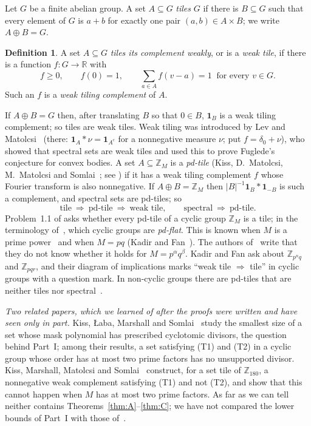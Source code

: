 \documentclass[11pt,a4paper]{amsart}
\theoremstyle{definition}
\newtheorem{definition}[theorem]{Definition}
\theoremstyle{remark}
\newcommand{\Z}{\mathbb{Z}}
\newcommand{\R}{\mathbb{R}}
\newcommand{\one}{\mathbf{1}}
\begin{document}
Let $G$ be a finite abelian group. A set $A\subseteq G$ \emph{tiles} $G$ if there is $B\subseteq G$ such that
every element of $G$ is $a+b$ for exactly one pair $(a,b)\in A\times B$; we write $A\oplus B=G$.

\begin{definition}
A set $A\subseteq G$ \emph{tiles its complement weakly}, or is a \emph{weak tile}, if there is a function
$f\colon G\to\R$ with
\[
 f\ge 0,\qquad f(0)=1,\qquad \sum_{a\in A} f(v-a)=1\ \text{ for every } v\in G .
\]
Such an $f$ is a \emph{weak tiling complement} of $A$.
\end{definition}

If $A\oplus B=G$ then, after translating $B$ so that $0\in B$, $\one_B$ is a weak tiling complement; so tiles are
weak tiles. Weak tiling was introduced by Lev and Matolcsi~\cite{LM} (there: $\one_A*\nu=\one_{A^c}$ for a
nonnegative measure $\nu$; put $f=\delta_0+\nu$), who showed that spectral sets are weak tiles and used this to
prove Fuglede's conjecture for convex bodies. A set $A\subseteq\Z_M$ is a \emph{pd-tile} (Kiss, D.~Matolcsi,
M.~Matolcsi and Somlai~\cite{KMMS}; see \cite{KLMS}) if it has a weak tiling complement $f$ whose Fourier
transform is also nonnegative. If $A\oplus B=\Z_M$ then $|B|^{-1}\one_B*\one_{-B}$ is such a complement, and
spectral sets are pd-tiles; so
\[
 \text{tile}\ \Longrightarrow\ \text{pd-tile}\ \Longrightarrow\ \text{weak tile},\qquad
 \text{spectral}\ \Longrightarrow\ \text{pd-tile}.
\]
Problem~1.1 of \cite{KLMS} asks whether every pd-tile of a cyclic group $\Z_M$ is a tile; in the terminology
of~\cite{KMMS}, which cyclic groups are \emph{pd-flat}. This is known when $M$ is a prime power~\cite{KLMS} and
when $M=pq$ (Kadir and Fan~\cite{KF}). The authors of~\cite{KLMS} write that they do not know whether it holds
for $M=p^\alpha q^\beta$. Kadir and Fan ask about $\Z_{p^nq}$ and $\Z_{pqr}$, and their diagram of implications
marks ``weak tile $\Rightarrow$ tile'' in cyclic groups with a question mark. In non-cyclic groups there are
pd-tiles that are neither tiles nor spectral~\cite{KLMS2}.

\emph{Two related papers, which we learned of after the proofs were written and have seen only in part.} Kiss,
{\L}aba, Marshall and Somlai~\cite{KLaMS} study the smallest size of a set whose mask polynomial has prescribed
cyclotomic divisors, the question behind Part~I; among their results, a set satisfying (T1) and (T2) in a cyclic
group whose order has at most two prime factors has no unsupported divisor. Kiss, Marshall, Matolcsi and
Somlai~\cite{KMMS2} construct, for a set tile of $\Z_{180}$, a nonnegative weak complement satisfying (T1) and
not (T2), and show that this cannot happen when $M$ has at most two prime factors. As far as we can tell neither
contains Theorems~\ref{thm:A}--\ref{thm:C}; we have not compared the lower bounds of Part~I with those
of~\cite{KLaMS}.
\end{document}
